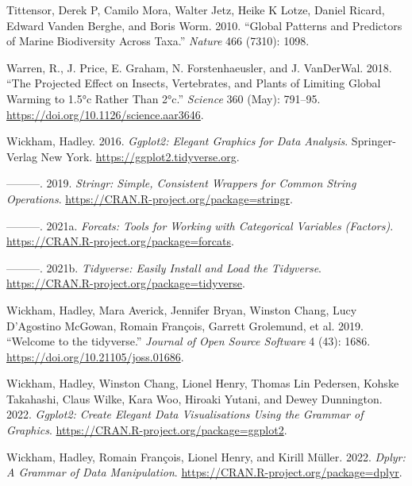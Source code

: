 \documentclass[
]{book}
\newlength{\cslhangindent}
\newlength{\cslentryspacingunit} %
\newenvironment{CSLReferences}[2] %
 {%
  \setlength{\parindent}{0pt}
  \ifodd #1
  \let\oldpar\par
  \def\par{\hangindent=\cslhangindent\oldpar}
  \fi
  \setlength{\parskip}{#2\cslentryspacingunit}
 }%
 {}
\begin{document}
\begin{CSLReferences}{1}{0}
\leavevmode{}%
Tittensor, Derek P, Camilo Mora, Walter Jetz, Heike K Lotze, Daniel Ricard, Edward Vanden Berghe, and Boris Worm. 2010. {``Global Patterns and Predictors of Marine Biodiversity Across Taxa.''} \emph{Nature} 466 (7310): 1098.

\leavevmode{}%
Warren, R., J. Price, E. Graham, N. Forstenhaeusler, and J. VanDerWal. 2018. {``The Projected Effect on Insects, Vertebrates, and Plants of Limiting Global Warming to 1.5°c Rather Than 2°c.''} \emph{Science} 360 (May): 791--95. \url{https://doi.org/10.1126/science.aar3646}.

\leavevmode{}%
Wickham, Hadley. 2016. \emph{Ggplot2: Elegant Graphics for Data Analysis}. Springer-Verlag New York. \url{https://ggplot2.tidyverse.org}.

\leavevmode{}%
---------. 2019. \emph{Stringr: Simple, Consistent Wrappers for Common String Operations}. \url{https://CRAN.R-project.org/package=stringr}.

\leavevmode{}%
---------. 2021a. \emph{Forcats: Tools for Working with Categorical Variables (Factors)}. \url{https://CRAN.R-project.org/package=forcats}.

\leavevmode{}%
---------. 2021b. \emph{Tidyverse: Easily Install and Load the Tidyverse}. \url{https://CRAN.R-project.org/package=tidyverse}.

\leavevmode{}%
Wickham, Hadley, Mara Averick, Jennifer Bryan, Winston Chang, Lucy D'Agostino McGowan, Romain François, Garrett Grolemund, et al. 2019. {``Welcome to the {tidyverse}.''} \emph{Journal of Open Source Software} 4 (43): 1686. \url{https://doi.org/10.21105/joss.01686}.

\leavevmode{}%
Wickham, Hadley, Winston Chang, Lionel Henry, Thomas Lin Pedersen, Kohske Takahashi, Claus Wilke, Kara Woo, Hiroaki Yutani, and Dewey Dunnington. 2022. \emph{Ggplot2: Create Elegant Data Visualisations Using the Grammar of Graphics}. \url{https://CRAN.R-project.org/package=ggplot2}.

\leavevmode{}%
Wickham, Hadley, Romain François, Lionel Henry, and Kirill Müller. 2022. \emph{Dplyr: A Grammar of Data Manipulation}. \url{https://CRAN.R-project.org/package=dplyr}.


\end{CSLReferences}
\end{document}
